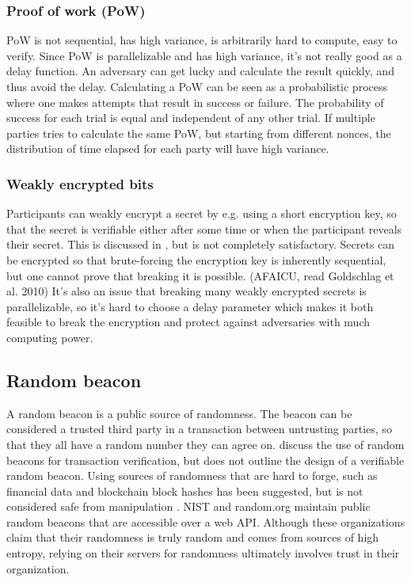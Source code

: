 \subsubsection{Proof of work (PoW)}
PoW is not sequential, has high variance, is arbitrarily hard to compute, easy to verify. Since PoW is parallelizable and has high variance, it's not really good as a delay function. An adversary can get lucky and calculate the result quickly, and thus avoid the delay. Calculating a PoW can be seen as a probabilistic process where one makes attempts that result in success or failure. The probability of success for each trial is equal and independent of any other trial. If multiple parties tries to calculate the same PoW, but starting from different nonces, the distribution of time elapsed for each party will have high variance.  

\subsubsection{Weakly encrypted bits}
Participants can weakly encrypt a secret by e.g. using a short encryption key, so that the secret is verifiable either after some time or when the participant reveals their secret.
This is discussed in \cite{syverson_weakly_1998}, but is not completely satisfactory. Secrets can be encrypted so that brute-forcing the encryption key is inherently sequential, but one cannot prove that breaking it is possible. (AFAICU, read Goldschlag et al. 2010)
It's also an issue that breaking many weakly encrypted secrets is parallelizable, so it's hard to choose a delay parameter which makes it both feasible to break the encryption and protect against adversaries with much computing power.


\subsection{Random beacon}
A random beacon is a public source of randomness. The beacon can be considered a trusted third party in a transaction between untrusting parties, so that they all have a random number they can agree on. \cite{rabin1983transaction} discuss the use of random beacons for transaction verification, but does not outline the design of a verifiable random beacon. Using sources of randomness that are hard to forge, such as financial data \cite{clark_use_2010} and blockchain block hashes \cite{bentov_bitcoin_2016} \cite{yajam_improvement_2019} has been suggested, but is not considered safe from manipulation \cite{pierrot_malleability_2018}. NIST and random.org maintain public random beacons that are accessible over a web API. Although these organizations claim that their randomness is truly random and comes from sources of high entropy, relying on their servers for randomness ultimately involves trust in their organization. 
